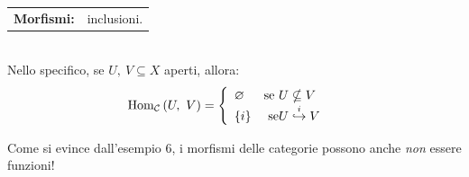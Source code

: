 \begin{examples}
\begin{itemize}
\begin{tabular*}{6cm}[t]{>{\bfseries}ll}
Morfismi: & inclusioni.
\end{tabular*}\\
Nello specifico, se $U,\ V\subseteq X$ aperti, allora:
\begin{equation*}
	\mathrm{Hom}_{\mathcal{C}}\left(U,\ V\right)=\begin{cases}
		\begin{array}{ll}
			\varnothing & \text{se } U\nsubseteq V\\
			\left\{i\right\} & \text{ se} U\stackrel{i}{\hookrightarrow} V
		\end{array}
	\end{cases}
\end{equation*}
\end{itemize}
\end{examples}
\begin{attention}
	Come si evince dall'esempio 6, i morfismi delle categorie possono anche \textit{non} essere funzioni!
\end{attention}
